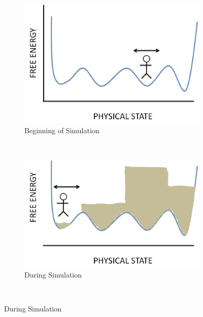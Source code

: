 \documentclass[superscriptaddress,showkeys, nofootinbib, pre, aps]{revtex4-1}
\begin{document}
\begin{figure}[H]
        \centering
        \begin{subfigure}[b]{0.3\textwidth}
                \centering
                \includegraphics[width=\textwidth]{figures/emptywell.png}
                \caption{Beginning of Simulation}
                \label{fig:emptywell}
        \end{subfigure}%
        ~ %
        \begin{subfigure}[b]{0.3\textwidth}
                \centering
                \includegraphics[width=\textwidth]{figures/halfwell.png}
                \caption{During Simulation}
                \label{fig:halfwell}
        \end{subfigure}
        ~ %

\end{figure}
\end{document}
